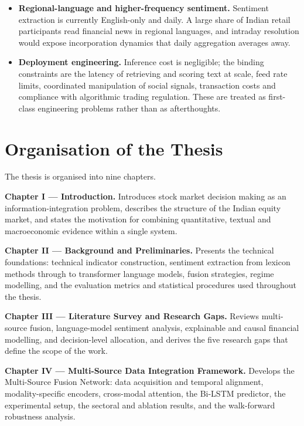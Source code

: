 \begin{itemize}
\item \textbf{Regional-language and higher-frequency sentiment.} Sentiment extraction is
currently English-only and daily. A large share of Indian retail participants read financial
news in regional languages, and intraday resolution would expose incorporation dynamics that
daily aggregation averages away.

\item \textbf{Deployment engineering.} Inference cost is negligible; the binding constraints
are the latency of retrieving and scoring text at scale, feed rate limits, coordinated
manipulation of social signals, transaction costs and compliance with algorithmic trading
regulation. These are treated as first-class engineering problems rather than as afterthoughts.
\end{itemize}

\chapter{Organisation of the Thesis}

The thesis is organised into nine chapters.

\textbf{Chapter I --- Introduction.} Introduces stock market decision making as an
information-integration problem, describes the structure of the Indian equity market, and
states the motivation for combining quantitative, textual and macroeconomic evidence within a
single system.

\textbf{Chapter II --- Background and Preliminaries.} Presents the technical foundations:
technical indicator construction, sentiment extraction from lexicon methods through to
transformer language models, fusion strategies, regime modelling, and the evaluation metrics
and statistical procedures used throughout the thesis.

\textbf{Chapter III --- Literature Survey and Research Gaps.} Reviews multi-source fusion,
language-model sentiment analysis, explainable and causal financial modelling, and
decision-level allocation, and derives the five research gaps that define the scope of the
work.

\textbf{Chapter IV --- Multi-Source Data Integration Framework.} Develops the Multi-Source
Fusion Network: data acquisition and temporal alignment, modality-specific encoders,
cross-modal attention, the Bi-LSTM predictor, the experimental setup, the sectoral and ablation
results, and the walk-forward robustness analysis.

